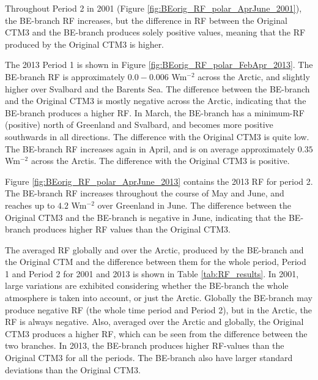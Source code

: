 \medskip

Throughout Period 2 in 2001 (Figure \ref{fig:BEorig_RF_polar_AprJune_2001}), the BE-branch RF increases, but the difference in RF between the Original CTM3 and the BE-branch produces solely positive values, meaning that the RF produced by the Original CTM3 is higher.

\medskip

The 2013 Period 1 is shown in Figure \ref{fig:BEorig_RF_polar_FebApr_2013}. The BE-branch RF is approximately $0.0-0.006$ Wm$^{-2}$ across the Arctic, and slightly higher over Svalbard and the Barents Sea. The difference between the BE-branch and the Original CTM3 is mostly negative across the Arctic, indicating that the BE-branch produces a higher RF. In March, the BE-branch has a minimum-RF (positive) north of Greenland and Svalbard, and becomes more positive southwards in all directions. The difference with the Original CTM3 is quite low. The BE-branch RF increases again in April, and is on average approximately $0.35$ Wm$^{-2}$ across the Arctis. The difference with the Original CTM3 is positive.

\medskip

Figure \ref{fig:BEorig_RF_polar_AprJune_2013} contains the 2013 RF for period 2. The BE-branch RF increases throughout the course of May and June, and reaches up to $4.2$ Wm$^{-2}$ over Greenland in June. The difference between the Original CTM3 and the BE-branch is negative in June, indicating that the BE-branch produces higher RF values than the  Original CTM3.

\medskip

The averaged RF globally and over the Arctic, produced by the BE-branch and the Original CTM and the difference between them for the whole period, Period 1 and Period 2 for 2001 and 2013 is shown in Table \ref{tab:RF_results}. In 2001, large variations are exhibited considering whether the BE-branch the whole atmosphere is taken into account, or just the Arctic. Globally the BE-branch may produce negative RF (the whole time period and Period 2), but in the Arctic, the RF is always negative. Also, averaged over the Arctic and globally, the Original CTM3 produces a higher RF, which can be seen from the difference between the two branches. In 2013, the BE-branch produces higher RF-values than the Original CTM3 for all the periods. The BE-branch also have larger standard deviations than the Original CTM3. 

\medskip










